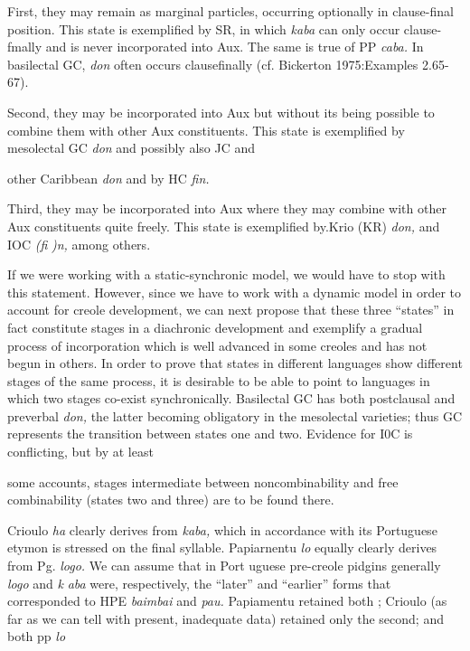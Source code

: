 First, they may remain as marginal particles, occurring option\-ally in clause-final position. This state is exemplified by SR, in which \textit{kaba} can only occur clause-fmally and is never incorporated into Aux. The same is true of PP \textit{caba.} In basilectal GC, \textit{don} often occurs clause\-finally (cf. Bickerton 1975:Examples 2.65-67).

Second, they may be incorporated into Aux but without its being possible to combine them with other Aux constituents. This state is exemplified by mesolectal GC \textit{don} and possibly also JC and

other Caribbean \textit{don} and by HC \textit{fin.}

Third, they may be incorporated into Aux where they may combine with other Aux constituents quite freely. This state is exem\-plified by.Krio (KR) \textit{don,} and IOC \textit{(fi} \textit{)n,} among others.

If we were working with a static-synchronic model, we would have to stop with this statement. However, since we have to work with a dynamic model in order to account for creole development, we can next propose that these three ``states'' in fact constitute stages in a diachronic development and exemplify a gradual process of incorpora\-tion which is well advanced in some creoles and has not begun in others. In order to prove that states in different languages show differ\-ent stages of the same process, it is desirable to be able to point to languages in which two stages co-exist synchronically. Basilectal GC has both postclausal and preverbal \textit{don,} the latter becoming obligatory in the mesolectal varieties; thus GC represents the transition between states one and two. Evidence for I0C is conflicting, but by at least


some accounts, stages intermediate between noncombinability and free combinability (states two and three) are to be found there.

Crioulo \textit{ha} clearly derives from \textit{kaba,} which in accordance with its Portuguese etymon is stressed on the final syllable. Papiarnentu \textit{lo }equally clearly derives from Pg. \textit{logo.} We can assume that in Port uguese pre-creole pidgins generally \textit{logo} and \textit{k} \textit{aba} were, respectively, the ``later'' and ``earlier'' forms that corresponded to HPE \textit{baimbai }and \textit{pau.} Papiamentu retained both ; Crioulo (as far as we can tell with present, inadequate data) retained only the second; and both pp \textit{lo}


